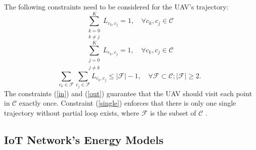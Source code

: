 \documentclass[journal]{IEEEtran}
\begin{document}
    The following constraints need to be considered for the UAV's trajectory:
	\begin{equation}
	\label{in}
	\sum_{\substack{k=0 \\ k \neq j}}^{K}L_{c_k,c_j} = 1, \quad \forall{c_k, c_j} \in {\mathcal{C}}
	\end{equation}
	\begin{equation}
	\label{out}
	\sum_{\substack{j=0 \\ j \neq k}}^{K}L_{c_k,c_j} = 1, \quad \forall{c_k, c_j} \in {\mathcal{C}}
	\end{equation}
	\begin{equation}
	\label{single}
	\sum_{c_k \in {\mathcal{F}}}\sum_{c_j \in \mathcal{F}}L_{c_k,c_j} \leq |\mathcal{F}| - 1,\quad \forall{\mathcal{F}} \subset \mathcal{C}; |\mathcal{F}| \geq 2.
	\end{equation}
	The constraints (\ref{in}) and (\ref{out}) guarantee that the UAV should visit each point in $\mathcal{C}$ exactly once. Constraint (\ref{single}) enforces that there is only one single trajectory without partial loop exists, where $\mathcal{F}$ is the subset of $\mathcal{C}$ \cite{R. Roberti}.

    \subsection{IoT Network's Energy Models}
\end{document}
